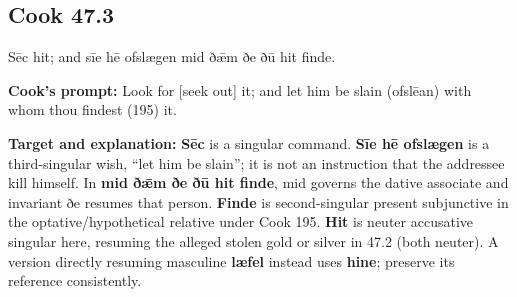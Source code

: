 \par\begin{minipage}{\linewidth}\raggedright
\subsection*{Cook 47.3}

Sēc hit; and sīe hē ofslægen mid ðǣm ðe ðū hit finde.

\textbf{Cook’s prompt:} Look for [seek out] it; and let him be slain (ofslēan) with whom thou findest (195) it.

\textbf{Target and explanation:} \textbf{Sēc} is a singular command. \textbf{Sīe hē ofslægen} is a third-singular wish, “let him be slain”; it is not an instruction that the addressee kill himself. In \textbf{mid ðǣm ðe ðū hit finde}, mid governs the dative associate and invariant ðe resumes that person. \textbf{Finde} is second-singular present subjunctive in the optative/\allowbreak{}hypothetical relative under Cook 195. \textbf{Hit} is neuter accusative singular here, resuming the alleged stolen gold or silver in 47.2 (both neuter). A version directly resuming masculine \textbf{læfel} instead uses \textbf{hine}; preserve its reference consistently.

\end{minipage}\par\addvspace{4pt}

